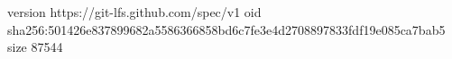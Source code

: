 version https://git-lfs.github.com/spec/v1
oid sha256:501426e837899682a5586366858bd6c7fe3e4d2708897833fdf19e085ca7bab5
size 87544
